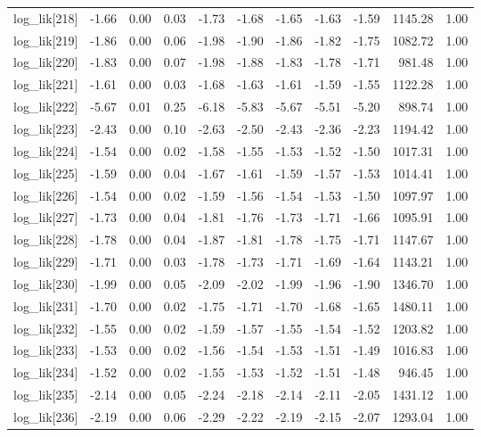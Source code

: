 \begin{table}[ht]
\begin{tabular}{rrrrrrrrrrr}
  log\_lik[218] & -1.66 & 0.00 & 0.03 & -1.73 & -1.68 & -1.65 & -1.63 & -1.59 & 1145.28 & 1.00 \\ 
  log\_lik[219] & -1.86 & 0.00 & 0.06 & -1.98 & -1.90 & -1.86 & -1.82 & -1.75 & 1082.72 & 1.00 \\ 
  log\_lik[220] & -1.83 & 0.00 & 0.07 & -1.98 & -1.88 & -1.83 & -1.78 & -1.71 & 981.48 & 1.00 \\ 
  log\_lik[221] & -1.61 & 0.00 & 0.03 & -1.68 & -1.63 & -1.61 & -1.59 & -1.55 & 1122.28 & 1.00 \\ 
  log\_lik[222] & -5.67 & 0.01 & 0.25 & -6.18 & -5.83 & -5.67 & -5.51 & -5.20 & 898.74 & 1.00 \\ 
  log\_lik[223] & -2.43 & 0.00 & 0.10 & -2.63 & -2.50 & -2.43 & -2.36 & -2.23 & 1194.42 & 1.00 \\ 
  log\_lik[224] & -1.54 & 0.00 & 0.02 & -1.58 & -1.55 & -1.53 & -1.52 & -1.50 & 1017.31 & 1.00 \\ 
  log\_lik[225] & -1.59 & 0.00 & 0.04 & -1.67 & -1.61 & -1.59 & -1.57 & -1.53 & 1014.41 & 1.00 \\ 
  log\_lik[226] & -1.54 & 0.00 & 0.02 & -1.59 & -1.56 & -1.54 & -1.53 & -1.50 & 1097.97 & 1.00 \\ 
  log\_lik[227] & -1.73 & 0.00 & 0.04 & -1.81 & -1.76 & -1.73 & -1.71 & -1.66 & 1095.91 & 1.00 \\ 
  log\_lik[228] & -1.78 & 0.00 & 0.04 & -1.87 & -1.81 & -1.78 & -1.75 & -1.71 & 1147.67 & 1.00 \\ 
  log\_lik[229] & -1.71 & 0.00 & 0.03 & -1.78 & -1.73 & -1.71 & -1.69 & -1.64 & 1143.21 & 1.00 \\ 
  log\_lik[230] & -1.99 & 0.00 & 0.05 & -2.09 & -2.02 & -1.99 & -1.96 & -1.90 & 1346.70 & 1.00 \\ 
  log\_lik[231] & -1.70 & 0.00 & 0.02 & -1.75 & -1.71 & -1.70 & -1.68 & -1.65 & 1480.11 & 1.00 \\ 
  log\_lik[232] & -1.55 & 0.00 & 0.02 & -1.59 & -1.57 & -1.55 & -1.54 & -1.52 & 1203.82 & 1.00 \\ 
  log\_lik[233] & -1.53 & 0.00 & 0.02 & -1.56 & -1.54 & -1.53 & -1.51 & -1.49 & 1016.83 & 1.00 \\ 
  log\_lik[234] & -1.52 & 0.00 & 0.02 & -1.55 & -1.53 & -1.52 & -1.51 & -1.48 & 946.45 & 1.00 \\ 
  log\_lik[235] & -2.14 & 0.00 & 0.05 & -2.24 & -2.18 & -2.14 & -2.11 & -2.05 & 1431.12 & 1.00 \\ 
  log\_lik[236] & -2.19 & 0.00 & 0.06 & -2.29 & -2.22 & -2.19 & -2.15 & -2.07 & 1293.04 & 1.00 \\ 

\end{tabular}
\end{table}
